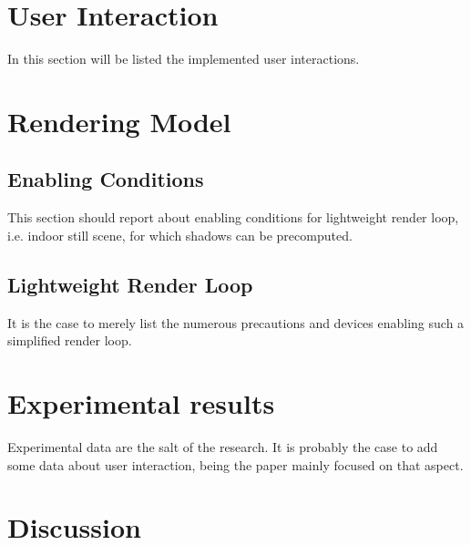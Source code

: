 \documentclass{sigchi}
\begin{document}


\section{User Interaction} %
\label{sec:user_interaction}

In this section will be listed the implemented user interactions.



\section{Rendering Model} %
\label{sec:rendering_model}

\subsection{Enabling Conditions} %
\label{sub:enabling_conditions}

This section should report about enabling conditions for lightweight render loop, i.e. indoor still scene, for which shadows can be precomputed.


\subsection{Lightweight Render Loop} %
\label{sub:lightweight_render_loop}

It is the case to merely list the numerous precautions and devices enabling such a simplified render loop.




\section{Experimental results} %
\label{sec:experimental_results}

Experimental data are the salt of the research. It is probably the case to add some data about user interaction, being the paper mainly focused on that aspect.



\section{Discussion}  %
\label{sec:discussion}
\end{document}

